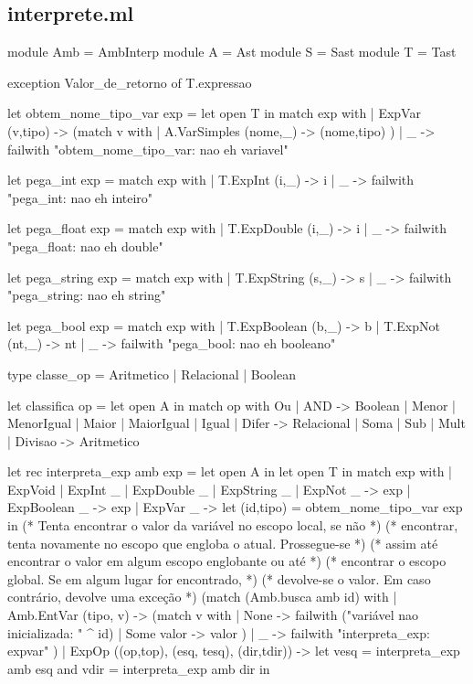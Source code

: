 \documentclass[12pt,a4paper,twoside]{report}
\begin{document}
\subsection{interprete.ml}
\begin{terminal}
module Amb = AmbInterp
module A = Ast
module S = Sast
module T = Tast

exception Valor_de_retorno of T.expressao

let obtem_nome_tipo_var exp = let open T in
  match exp with
  | ExpVar (v,tipo) ->
    (match v with
      | A.VarSimples (nome,_) -> (nome,tipo)
    )
  | _ -> failwith "obtem_nome_tipo_var: nao eh variavel"

let pega_int exp =
  match exp with
  |  T.ExpInt (i,_) -> i
  | _ -> failwith "pega_int: nao eh inteiro"

let pega_float exp =
  match exp with
  |  T.ExpDouble (i,_) -> i
  | _ -> failwith "pega_float: nao eh double"

let pega_string exp =
  match exp with
  |  T.ExpString (s,_) -> s
  | _ -> failwith "pega_string: nao eh string"

let pega_bool exp =
  match exp with
  |  T.ExpBoolean (b,_) -> b
  |  T.ExpNot (nt,_) -> nt
  | _ -> failwith "pega_bool: nao eh booleano"

type classe_op = Aritmetico | Relacional | Boolean

let classifica op =
  let open A in
  match op with
    Ou
  | AND -> Boolean
  | Menor
  | MenorIgual
  | Maior
  | MaiorIgual
  | Igual
  | Difer -> Relacional
  | Soma
  | Sub
  | Mult
  | Divisao -> Aritmetico


let rec interpreta_exp amb exp =
  let open A in
  let open T in
  match exp with
  | ExpVoid
  | ExpInt _
  | ExpDouble _
  | ExpString _
  | ExpNot _   -> exp
  | ExpBoolean _   -> exp
  | ExpVar _ ->
       let (id,tipo) = obtem_nome_tipo_var exp in
    (* Tenta encontrar o valor da variável no escopo local, se não      *)
    (* encontrar, tenta novamente no escopo que engloba o atual. Prossegue-se *)
    (* assim até encontrar o valor em algum escopo englobante ou até    *)
    (* encontrar o escopo global. Se em algum lugar for encontrado,         *)
    (* devolve-se o valor. Em caso contrário, devolve uma exceção       *)
    (match (Amb.busca amb id) with
     | Amb.EntVar (tipo, v) ->
       (match v with
        | None -> failwith ("variável nao inicializada: " ^ id)
        | Some valor -> valor
       )
     |  _ -> failwith "interpreta_exp: expvar"
    )
  | ExpOp ((op,top), (esq, tesq), (dir,tdir)) ->
    let  vesq = interpreta_exp amb esq
    and vdir = interpreta_exp amb dir in


\end{terminal}
\end{document}
